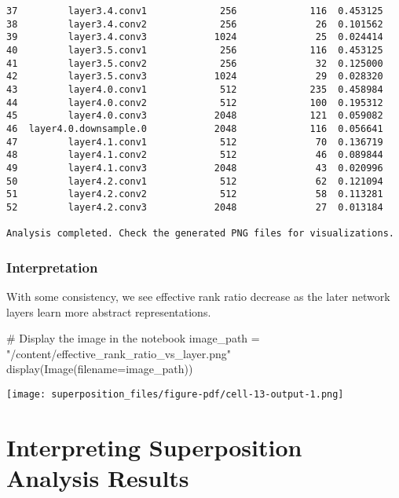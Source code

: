 \documentclass[
  letterpaper,
  DIV=11,
  numbers=noendperiod]{scrreprt}
\newenvironment{Shaded}{\begin{snugshade}}{\end{snugshade}}
\newcommand{\CommentTok}[1]{\textcolor[rgb]{0.37,0.37,0.37}{#1}}
\newcommand{\NormalTok}[1]{\textcolor[rgb]{0.00,0.23,0.31}{#1}}
\newcommand{\OperatorTok}[1]{\textcolor[rgb]{0.37,0.37,0.37}{#1}}
\newcommand{\StringTok}[1]{\textcolor[rgb]{0.13,0.47,0.30}{#1}}
\begin{document}
\begin{verbatim}
37         layer3.4.conv1             256             116  0.453125
38         layer3.4.conv2             256              26  0.101562
39         layer3.4.conv3            1024              25  0.024414
40         layer3.5.conv1             256             116  0.453125
41         layer3.5.conv2             256              32  0.125000
42         layer3.5.conv3            1024              29  0.028320
43         layer4.0.conv1             512             235  0.458984
44         layer4.0.conv2             512             100  0.195312
45         layer4.0.conv3            2048             121  0.059082
46  layer4.0.downsample.0            2048             116  0.056641
47         layer4.1.conv1             512              70  0.136719
48         layer4.1.conv2             512              46  0.089844
49         layer4.1.conv3            2048              43  0.020996
50         layer4.2.conv1             512              62  0.121094
51         layer4.2.conv2             512              58  0.113281
52         layer4.2.conv3            2048              27  0.013184

Analysis completed. Check the generated PNG files for visualizations.
\end{verbatim}

\subsection{Interpretation}\label{interpretation-1}

With some consistency, we see effective rank ratio decrease as the later
network layers learn more abstract representations.

\begin{Shaded}
\begin{Highlighting}[]
\CommentTok{\# Display the image in the notebook}
\NormalTok{image\_path }\OperatorTok{=} \StringTok{"/content/effective\_rank\_ratio\_vs\_layer.png"}
\NormalTok{display(Image(filename}\OperatorTok{=}\NormalTok{image\_path))}
\end{Highlighting}
\end{Shaded}

\texttt{[image: superposition\_files/figure-pdf/cell-13-output-1.png]}


\chapter{Interpreting Superposition Analysis
Results}\label{interpreting-superposition-analysis-results}
\end{document}
